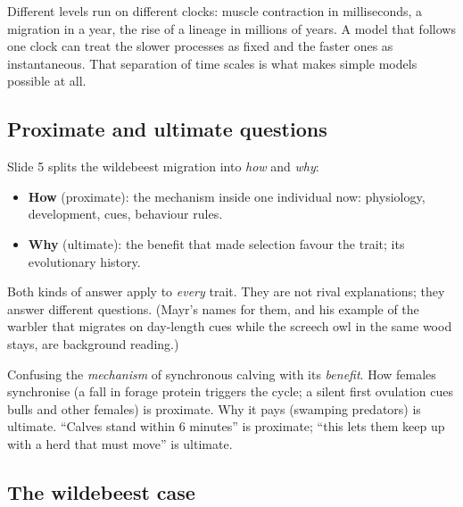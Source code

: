 Different levels run on different clocks: muscle contraction in milliseconds, a migration in a year, the rise of a
lineage in millions of years. A model that follows one clock can treat the slower processes as fixed and the
faster ones as instantaneous. That separation of time scales is what makes simple models possible at all.

\subsection{Proximate and ultimate questions}
Slide 5 splits the wildebeest migration into \emph{how} and \emph{why}:
\begin{itemize}
\item \textbf{How} (proximate): the mechanism inside one individual now: physiology, development, cues, behaviour rules.
\item \textbf{Why} (ultimate): the benefit that made selection favour the trait; its evolutionary history.
\end{itemize}
Both kinds of answer apply to \emph{every} trait. They are not rival explanations; they answer different
questions. (Mayr's names for them, and his example of the warbler that migrates on day-length cues while the
screech owl in the same wood stays, are background reading.)

\begin{trap}
Confusing the \emph{mechanism} of synchronous calving with its \emph{benefit}. How females synchronise (a fall in
forage protein triggers the cycle; a silent first ovulation cues bulls and other females) is proximate. Why it pays
(swamping predators) is ultimate. ``Calves stand within 6 minutes'' is proximate; ``this lets them keep up with a
herd that must move'' is ultimate.
\end{trap}

\subsection{The wildebeest case}
